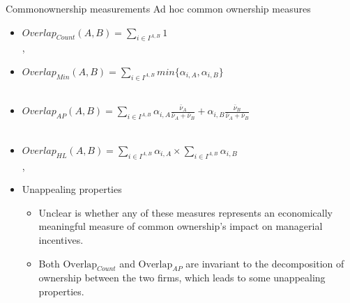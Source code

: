 \documentclass{beamer}
\begin{document}
	\normalsize
	
	\begin{frame}{Commonownership measurements}{ Ad hoc common ownership measures}
		
		\begin{itemize}
			\item \color{cyan} \small $   Overlap_{Count}(A,B)= \sum_{i\in I^{A,B}} 1 $  \normalcolor\\
			\tiny  \cite{he2017product},\cite{he2019internalizing}  \\ 
			
			\normalsize
			\item \color{cyan} \small $   Overlap_{Min}(A,B)= \sum_{i\in I^{A,B}} min\{\alpha_{i,A},\alpha_{i,B}\} $  \normalcolor\\
			\tiny \cite{newham2018common}  \\ 
			
			\normalsize
			\item \color{cyan} \small $   Overlap_{AP}(A,B)= \sum_{i\in I^{A,B}} \alpha_{i,A}\frac{\bar{\nu}_A}{\bar{\nu}_A +\bar{\nu}_B } + \alpha_{i,B}\frac{\bar{\nu}_B}{\bar{\nu}_A +\bar{\nu}_B } $  \normalcolor\\
			\tiny \cite{AntonPolk} \\ 
			
			\normalsize
			\item \color{cyan} \small $   Overlap_{HL}(A,B)= \sum_{i\in I^{A,B}} \alpha_{i,A} \times \sum_{i\in I^{A,B}} \alpha_{i,B} $  \normalcolor\\
			\tiny \cite{hansen1996externalities} , \cite{freeman2019effects} \\ 
			\normalsize
			\item Unappealing properties
			\begin{itemize}
				\item  Unclear is whether any of these
				measures represents an economically meaningful measure
				of common ownership’s impact on managerial incentives.
				\item Both $  \text{Overlap}_{Count} $ and $  \text{Overlap}_{AP} $ are invariant
				to the decomposition of ownership between the two firms,
				which leads to some unappealing properties.
			\end{itemize}
		\end{itemize}
		
		\hfill
		\hyperlink{mainmeasure}{}
	\end{frame}
	
	
\end{document}

